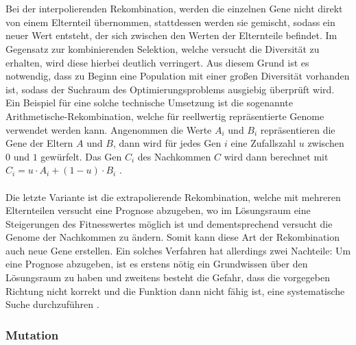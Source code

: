 \\\\
Bei der interpolierenden Rekombination, werden die einzelnen Gene nicht direkt von einem Elternteil übernommen, stattdessen werden sie gemischt, sodass ein neuer Wert entsteht, der sich zwischen den Werten der Elternteile befindet. Im Gegensatz zur kombinierenden Selektion, welche versucht die Diversität zu erhalten, wird diese hierbei deutlich verringert. Aus diesem Grund ist es notwendig, dass zu Beginn eine Population mit einer großen Diversität vorhanden ist, sodass der Suchraum  des Optimierungsproblems ausgiebig überprüft wird. Ein Beispiel für eine solche technische Umsetzung ist die sogenannte Arithmetische-Rekombination, welche für reellwertig repräsentierte Genome verwendet werden kann. Angenommen die Werte $A_i$ und $B_i$ repräsentieren die Gene der Eltern $A$ und $B$, dann wird für jedes Gen $i$ eine Zufallszahl $u$ zwischen $0$ und $1$ gewürfelt. Das Gen $C_i$ des Nachkommen $C$ wird dann berechnet mit $C_i=u \cdot A_i + (1-u) \cdot B_i$ \cite{weicker2015evolutionare}.
\\\\
Die letzte Variante ist die extrapolierende Rekombination, welche mit mehreren Elternteilen versucht eine Prognose abzugeben, wo im Lösungsraum eine Steigerungen des Fitnesswertes möglich ist und dementsprechend versucht die Genome der Nachkommen zu ändern. Somit kann diese Art der Rekombination auch neue Gene erstellen. Ein solches Verfahren hat allerdings zwei Nachteile: Um eine Prognose abzugeben, ist es erstens nötig ein Grundwissen über den Lösungsraum zu haben und zweitens besteht die Gefahr, dass die vorgegeben Richtung nicht korrekt und die Funktion dann nicht fähig ist, eine systematische Suche durchzuführen \cite{weicker2015evolutionare}.   

\subsubsection{Mutation}



































